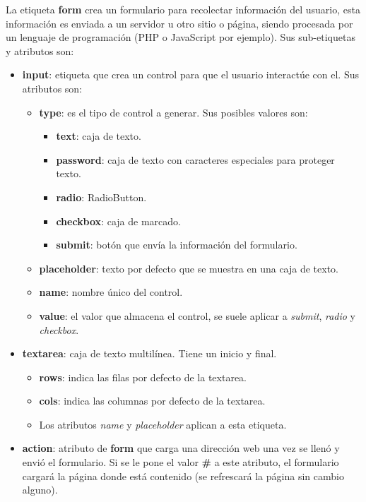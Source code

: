 La etiqueta \textbf{form} crea un formulario para recolectar información del usuario, esta información es enviada a un servidor u otro sitio o página, siendo procesada por un lenguaje de programación (PHP o JavaScript por ejemplo). Sus sub-etiquetas y atributos son:
\begin{itemize}
    \item \textbf{input}: etiqueta que crea un control para que el usuario interactúe con el. Sus atributos son:
    \begin{itemize}
        \item \textbf{type}: es el tipo de control a generar. Sus posibles valores son:
        \begin{itemize}
            \item \textbf{text}: caja de texto.
            \item \textbf{password}: caja de texto con caracteres especiales para proteger texto.
            \item \textbf{radio}: RadioButton.
            \item \textbf{checkbox}: caja de marcado.
            \item \textbf{submit}: botón que envía la información del formulario.
        \end{itemize}
        \item \textbf{placeholder}: texto por defecto que se muestra en una caja de texto.
        \item \textbf{name}: nombre único del control.
        \item \textbf{value}: el valor que almacena el control, se suele aplicar a \textit{submit}, \textit{radio} y \textit{checkbox}.
    \end{itemize}
    \item \textbf{textarea}: caja de texto multilínea. Tiene un inicio y final.
    \begin{itemize}
        \item \textbf{rows}: indica las filas por defecto de la textarea.
        \item \textbf{cols}: indica las columnas por defecto de la textarea.
        \item Los atributos \textit{name} y \textit{placeholder} aplican a esta etiqueta.
    \end{itemize}
    \item \textbf{action}: atributo de \textbf{form} que carga una dirección web una vez se llenó y envió el formulario. Si se le pone el valor \textbf{\#} a este atributo, el formulario cargará la página donde está contenido (se refrescará la página sin cambio alguno).

\end{itemize}

